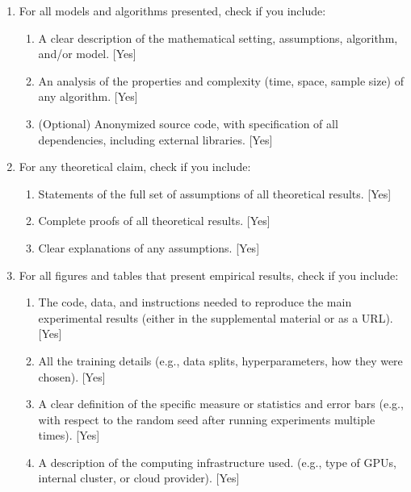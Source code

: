 \documentclass[twoside]{article}
\theoremstyle{thmstyleone}%
\theoremstyle{thmstyletwo}%
\theoremstyle{thmstylethree}%
\begin{document}
\begin{enumerate}

  \item For all models and algorithms presented, check if you include:
  \begin{enumerate}
    \item A clear description of the mathematical setting, assumptions, algorithm, and/or model. [Yes]
    \item An analysis of the properties and complexity (time, space, sample size) of any algorithm. [Yes]
    \item (Optional) Anonymized source code, with specification of all dependencies, including external libraries. [Yes]
  \end{enumerate}

  \item For any theoretical claim, check if you include:
  \begin{enumerate}
    \item Statements of the full set of assumptions of all theoretical results. [Yes]
    \item Complete proofs of all theoretical results. [Yes]
    \item Clear explanations of any assumptions. [Yes]
  \end{enumerate}

  \item For all figures and tables that present empirical results, check if you include:
  \begin{enumerate}
    \item The code, data, and instructions needed to reproduce the main experimental results (either in the supplemental material or as a URL). [Yes]
    \item All the training details (e.g., data splits, hyperparameters, how they were chosen). [Yes]
    \item A clear definition of the specific measure or statistics and error bars (e.g., with respect to the random seed after running experiments multiple times). [Yes]
    \item A description of the computing infrastructure used. (e.g., type of GPUs, internal cluster, or cloud provider). [Yes]
  \end{enumerate}


\end{enumerate}
\end{document}
